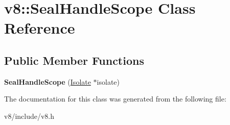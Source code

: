 \hypertarget{classv8_1_1SealHandleScope}{}\section{v8\+:\+:Seal\+Handle\+Scope Class Reference}
\label{classv8_1_1SealHandleScope}
\subsection*{Public Member Functions}
\begin{DoxyCompactItemize}
\item 
{\bfseries Seal\+Handle\+Scope} (\hyperlink{classv8_1_1Isolate}{Isolate} $\ast$isolate)\hypertarget{classv8_1_1SealHandleScope_acfdab75cc53b53d3ba1a50ab5f4fe16e}{}\label{classv8_1_1SealHandleScope_acfdab75cc53b53d3ba1a50ab5f4fe16e}

\end{DoxyCompactItemize}


The documentation for this class was generated from the following file\+:\begin{DoxyCompactItemize}
\item 
v8/include/v8.\+h\end{DoxyCompactItemize}
